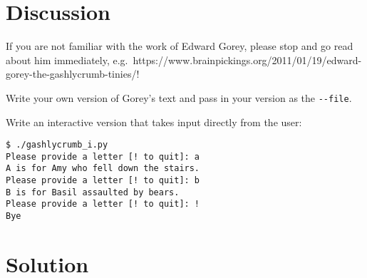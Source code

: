 \documentclass[]{article}
\begin{document}
\hypertarget{discussion}{%
\section{Discussion}\label{discussion}}

If you are not familiar with the work of Edward Gorey, please stop and
go read about him immediately,
e.g.~https://www.brainpickings.org/2011/01/19/edward-gorey-the-gashlycrumb-tinies/!

Write your own version of Gorey's text and pass in your version as the
\texttt{-\/-file}.

Write an interactive version that takes input directly from the user:

\begin{verbatim}
$ ./gashlycrumb_i.py
Please provide a letter [! to quit]: a
A is for Amy who fell down the stairs.
Please provide a letter [! to quit]: b
B is for Basil assaulted by bears.
Please provide a letter [! to quit]: !
Bye
\end{verbatim}

\pagebreak

\hypertarget{solution-5}{%
\section{Solution}\label{solution-5}}
\end{document}
